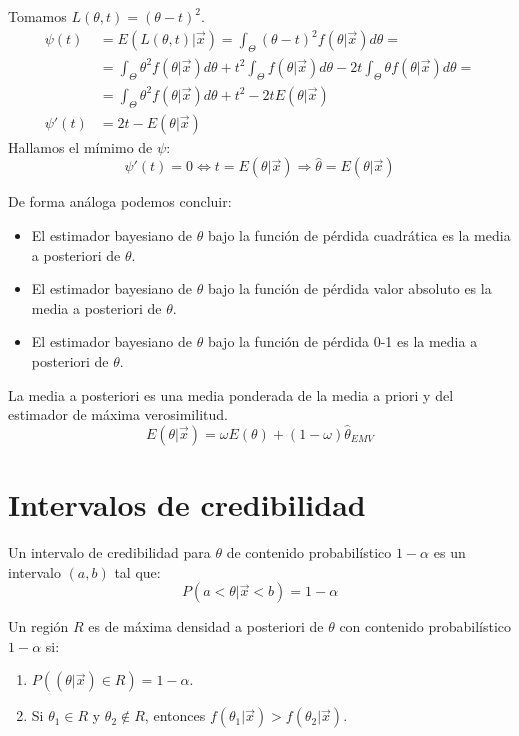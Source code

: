 \begin{example}
    Tomamos $L(\theta, t) = (\theta-t)^2$.
    \begin{align*}
        \psi(t)  & = E(L(\theta, t)|\vec{x}) = \int_\Theta (\theta-t)^2f(\theta|\vec{x})d\theta =                                                             \\
                 & = \int_\Theta \theta^2f(\theta|\vec{x})d\theta + t^2\int_\Theta f(\theta|\vec{x})d\theta - 2t\int_\Theta \theta f(\theta|\vec{x})d\theta = \\
                 & = \int_\Theta \theta^2f(\theta|\vec{x})d\theta + t^2 - 2tE(\theta|\vec{x})                                                                 \\
        \psi'(t) & = 2t - E(\theta|\vec{x})
    \end{align*}
    Hallamos el mímimo de $\psi$:
    $$\psi'(t) = 0 \Leftrightarrow t = E(\theta|\vec{x}) \Rightarrow \hat{\theta} = E(\theta|\vec{x})$$
\end{example}

De forma análoga podemos concluir:
\begin{itemize}
    \item El estimador bayesiano de $\theta$ bajo la función de pérdida cuadrática es la media a posteriori de $\theta$.
    \item El estimador bayesiano de $\theta$ bajo la función de pérdida valor absoluto es la media a posteriori de $\theta$.
    \item El estimador bayesiano de $\theta$ bajo la función de pérdida 0-1 es la media a posteriori de $\theta$.
\end{itemize}

\begin{remark}
    La media a posteriori es una media ponderada de la media a priori y del estimador de máxima verosimilitud.
    $$E(\theta|\vec{x}) = \omega E(\theta) + (1-\omega)\hat{\theta}_{EMV}$$
\end{remark}

\section{Intervalos de credibilidad}
Un intervalo de credibilidad para $\theta$ de contenido probabilístico $1-\alpha$ es un intervalo $(a, b)$ tal que:
$$P(a < \theta|\vec{x} < b) = 1-\alpha$$

\begin{definition}
    Un región $R$ es de máxima densidad a posteriori de $\theta$ con contenido probabilístico $1-\alpha$ si:
    \begin{enumerate}
        \item $P((\theta|\vec{x}) \in R) = 1-\alpha$.
        \item Si $\theta_1 \in R$ y $\theta_2 \notin R$, entonces $f(\theta_1|\vec{x}) > f(\theta_2|\vec{x})$.
    \end{enumerate}
\end{definition}

